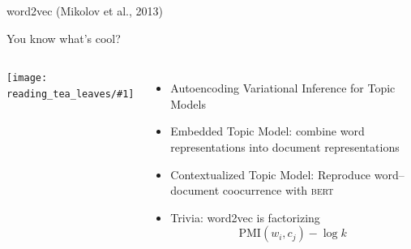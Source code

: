 \documentclass[compress]{beamer}
\newcommand{\abr}[1]{\textsc{#1} }
\newcommand{\fsi}[2]{
\begin{frame}[plain]
\vspace*{-1pt}
\makebox[\linewidth]{\texttt{[image: \#1]}}
\begin{center}
#2
\end{center}
\end{frame}
}
\newcommand{\gfxt}[2]{
\begin{center}
	\texttt{[image: reading\_tea\_leaves/\#1]}
\end{center}
}
\begin{document}
\fsi{general_figures/w2v_flow}{word2vec (Mikolov et al., 2013)}

\begin{frame}{You know what's cool?}

  \begin{columns}
    \gfxt{drake_neural}{.9}
  \begin{itemize}
  \item Autoencoding Variational Inference for Topic Models~\cite{srivastava-17}
    \item Embedded Topic Model: combine word representations into
      document representations~\cite{dieng-20}
    \item Contextualized Topic Model: Reproduce word--document
      coocurrence with \abr{bert}~\cite{bianchi-21}
    \pause
  \item Trivia: word2vec is factorizing
    \begin{equation}
      \mbox{PMI}(w_i, c_j) - \log k
    \end{equation}
  \end{itemize}

  \end{columns}
\end{frame}
\end{document}
